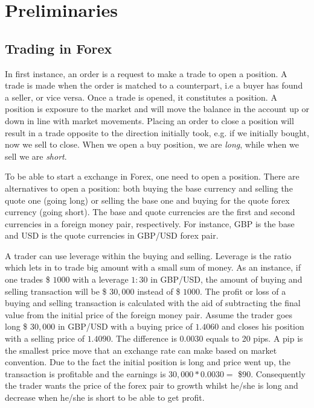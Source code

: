 \section{Preliminaries}

\subsection{Trading in Forex}
In first instance, an order is a request to make a trade to open a position.
A trade is made when the order is matched to a counterpart, i.e a buyer has found a seller, or vice versa.
Once a trade is opened, it constitutes a position. A position is exposure to the market and will move the balance in the account up or down in line with market movements. Placing an order to close a position will result in a trade opposite to the direction initially took, e.g. if we initially bought, now we sell to close. When we open a buy position, we are \textit{long}, while when we sell we are \textit{short}.

To be able to start a exchange in Forex, one need to open a position. There are alternatives to open a position: both buying the base currency and selling the quote one (going long) or selling the base one and buying for the quote forex currency (going short). The base and quote currencies are the first and second currencies in a foreign money pair, respectively. For instance, GBP is the base and USD is the quote currencies in GBP/USD forex pair.

A trader can use leverage within the buying and selling. Leverage is the ratio which lets in to trade big amount with a small sum of money. As an instance, if one trades \$ $1000$ with a leverage $1:30$ in GBP/USD, the amount of buying and selling transaction will be \$ $30,000$ instead of \$ $1000$.
The profit or loss of a buying and selling transaction is calculated with the aid of subtracting the final value from the initial price of the foreign money pair. Assume the trader goes long  \$ $30,000$ in GBP/USD with a buying price of $1.4060$ and closes his position with a selling price of $1.4090$. The difference is $0.0030$ equals to 20 pips. A pip is the smallest price move that an exchange rate can make based on market convention. Due to the fact the initial position is long and price went up, the transaction is profitable and the earnings is $30,000 * 0.0030 =$ \$90. Consequently the trader wants the price of the forex pair to growth whilst he/she is long and decrease when he/she is short to be able to get profit.

